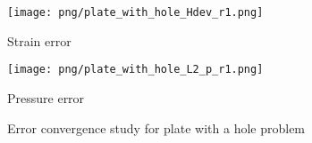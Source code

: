 \begin{figure}[H]
\centering
\begin{subcaptiongroup}
\centering
\parbox[b]{0.49\textwidth}{
    \texttt{[image: png/plate\_with\_hole\_Hdev\_r1.png]}
    \caption{Strain error}\label{fg:plate_with_hole_convergence_strain}
}
\parbox[b]{0.49\textwidth}{
    \texttt{[image: png/plate\_with\_hole\_L2\_p\_r1.png]}
    \caption{Pressure error}\label{fg:plate_with_hole_convergence_pressure}
}
\end{subcaptiongroup}
\caption{Error convergence study for plate with a hole problem}\label{fg:plate_with_hole_convergence}
\end{figure}

